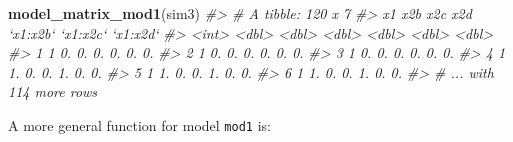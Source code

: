 \documentclass[]{book}
\newenvironment{Shaded}{\begin{snugshade}}{\end{snugshade}}
\newcommand{\CommentTok}[1]{\textcolor[rgb]{0.56,0.35,0.01}{\textit{#1}}}
\newcommand{\ControlFlowTok}[1]{\textcolor[rgb]{0.13,0.29,0.53}{\textbf{#1}}}
\newcommand{\DataTypeTok}[1]{\textcolor[rgb]{0.13,0.29,0.53}{#1}}
\newcommand{\KeywordTok}[1]{\textcolor[rgb]{0.13,0.29,0.53}{\textbf{#1}}}
\newcommand{\NormalTok}[1]{#1}
\newcommand{\OperatorTok}[1]{\textcolor[rgb]{0.81,0.36,0.00}{\textbf{#1}}}
\newcommand{\StringTok}[1]{\textcolor[rgb]{0.31,0.60,0.02}{#1}}
\theoremstyle{definition}
\theoremstyle{definition}
\theoremstyle{definition}
\theoremstyle{remark}
\begin{document}
\begin{Shaded}
\begin{Highlighting}[]
\KeywordTok{model_matrix_mod1}\NormalTok{(sim3)}
\CommentTok{#> # A tibble: 120 x 7}
\CommentTok{#>      x1   x2b   x2c   x2d `x1:x2b` `x1:x2c` `x1:x2d`}
\CommentTok{#>   <int> <dbl> <dbl> <dbl>    <dbl>    <dbl>    <dbl>}
\CommentTok{#> 1     1    0.    0.    0.       0.       0.       0.}
\CommentTok{#> 2     1    0.    0.    0.       0.       0.       0.}
\CommentTok{#> 3     1    0.    0.    0.       0.       0.       0.}
\CommentTok{#> 4     1    1.    0.    0.       1.       0.       0.}
\CommentTok{#> 5     1    1.    0.    0.       1.       0.       0.}
\CommentTok{#> 6     1    1.    0.    0.       1.       0.       0.}
\CommentTok{#> # ... with 114 more rows}
\end{Highlighting}
\end{Shaded}

\begin{Shaded}
\end{Shaded}

A more general function for model \texttt{mod1} is:
\end{document}
